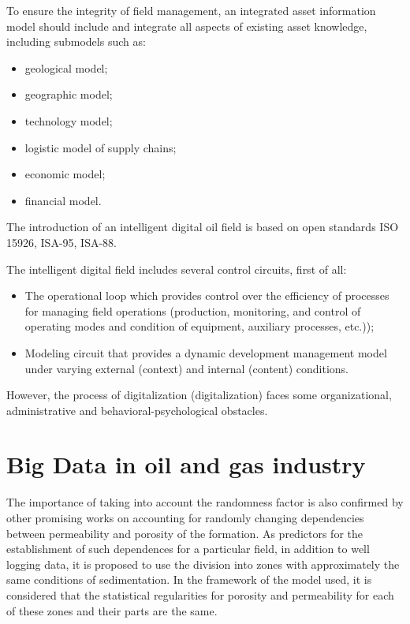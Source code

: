 \documentclass[12pt]{report}
\theoremstyle{definition}
\providecommand{\tightlist}{%
	\setlength{\itemsep}{0pt}\setlength{\parskip}{0pt}}
\begin{document}
To ensure the integrity of field management, an integrated asset information model should include and integrate all aspects of existing asset knowledge, including submodels such as:  

\begin{itemize}
	\tightlist
	\item geological model; 
	\item geographic model;
	\item technology model;
	\item logistic model of supply chains;
	\item economic model; 
	\item financial model.
\end{itemize}

The introduction of an intelligent digital oil field is based on open standards ISO 15926, ISA-95, ISA-88.

The intelligent digital field includes several control circuits, first of all:  
\begin{itemize} 
	\tightlist 
	\item The operational loop which provides control over the efficiency of processes for managing field operations (production, monitoring, and control of operating modes and condition of equipment, auxiliary processes, etc.)); 
	\item Modeling circuit that provides a dynamic development management model under varying external (context) and internal (content) conditions.
\end{itemize}  

However, the process of digitalization (digitalization) faces some organizational, administrative and behavioral-psychological obstacles.

\section{Big Data in oil and gas industry}
The importance of taking into account the randomness factor is also confirmed by other promising works on accounting for randomly changing dependencies between permeability and porosity of the formation.
As predictors for the establishment of such dependences for a particular field, in addition to well logging data, it is proposed to use the division into zones with approximately the same conditions of sedimentation.
In the framework of the model used, it is considered that the statistical regularities for porosity and permeability for each of these zones and their parts are the same.
\end{document}
